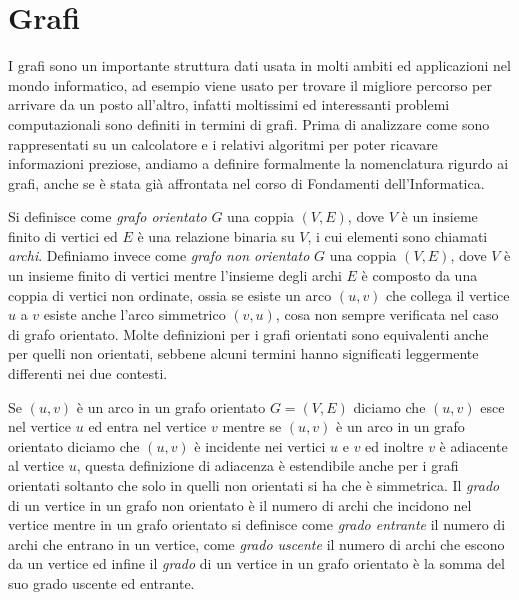\chapter{Grafi}
I grafi sono un importante struttura dati usata in molti ambiti ed applicazioni nel mondo informatico, ad esempio viene usato per trovare il migliore percorso per arrivare 
da un posto all'altro, infatti moltissimi ed interessanti problemi computazionali sono definiti in termini di grafi.\newline
Prima di analizzare come sono rappresentati su un calcolatore e i relativi algoritmi per poter ricavare informazioni preziose, andiamo a definire formalmente la 
nomenclatura rigurdo ai grafi, anche se è stata già affrontata nel corso di Fondamenti dell'Informatica.

Si definisce come \emph{grafo orientato} $G$ una coppia $(V, E)$, dove $V$ è un insieme finito di vertici ed $E$ è una relazione binaria su $V$,
i cui elementi sono chiamati \emph{archi}.\newline
Definiamo invece come \emph{grafo non orientato} $G$ una coppia $(V, E)$, dove $V$ è un insieme finito di vertici mentre l'insieme degli archi $E$ è composto da 
una coppia di vertici non ordinate, ossia se esiste un arco $(u, v)$ che collega il vertice $u$ a $v$ esiste anche l'arco simmetrico $(v, u)$, cosa non sempre verificata
nel caso di grafo orientato.\newline
Molte definizioni per i grafi orientati sono equivalenti anche per quelli non orientati, sebbene alcuni termini hanno significati leggermente differenti nei due contesti.

Se $(u, v)$ è un arco in un grafo orientato $G = (V, E)$ diciamo che $(u, v)$ esce nel vertice $u$ ed entra nel vertice $v$ mentre se $(u, v)$ è un arco in un grafo orientato
diciamo che $(u, v)$ è incidente nei vertici $u$ e $v$ ed inoltre $v$ è adiacente al vertice $u$, questa definizione di adiacenza è estendibile anche per i grafi orientati soltanto
che solo in quelli non orientati si ha che è simmetrica.\newline
Il \emph{grado} di un vertice in un grafo non orientato è il numero di archi che incidono nel vertice mentre in un grafo orientato si definisce come \emph{grado entrante}
il numero di archi che entrano in un vertice, come \emph{grado uscente} il numero di archi che escono da un vertice ed infine il \emph{grado} di un vertice in un grafo orientato
è la somma del suo grado uscente ed entrante.

